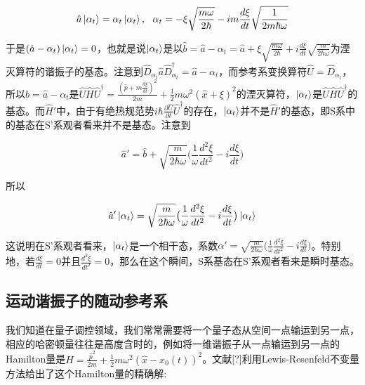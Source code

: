 \documentclass[a4paper]{article}
\begin{document}
        \begin{equation}
            \hat{a}\ket{\alpha_t}=\alpha_t\ket{\alpha_t},\ \ \alpha_t=-\xi\sqrt{\frac{m\omega}{2\hbar}}-im\frac{d\xi}{dt}\sqrt{\frac{1}{2m\hbar\omega}}
        \end{equation}

        于是$(\hat{a}-\alpha_t)\ket{\alpha_t}=0$，也就是说$\ket{\alpha_t}$是以$\hat{b}=\hat{a}-\alpha_t=\hat{a}+\xi\sqrt{\frac{m\omega}{2\hbar}}+i\frac{d\xi}{dt}\sqrt{\frac{m}{2\hbar\omega}}$为湮灭算符的谐振子的基态。注意到$\hat{D}_{\alpha_t}\hat{a}\hat{D}_{\alpha_t}^\dagger=\hat{a}-\alpha_t$，而参考系变换算符$\hat{U}=\hat{D}_{\alpha_t}$，所以$\hat{b}=\hat{a}-\alpha_t$是$\hat{U}\hat{H}\hat{U}^\dagger=\frac{(\hat{p}+m\frac{d\xi}{dt})^2}{2m}+\frac{1}{2}m\omega^2(\hat{x}+\xi)^2$的湮灭算符，$\ket{\alpha_t}$是$\hat{U}\hat{H}\hat{U}^\dagger$的基态。而$\hat{H}'$中，由于有绝热规范势$i\hbar\frac{\partial\hat{U}}{\partial t}\hat{U}^\dagger$的存在，$\ket{\alpha_t}$并不是$\hat{H}'$的基态，即S系中的基态在S'系观者看来并不是基态。注意到
        
        \begin{equation}
            \hat{a}'=\hat{b}+\sqrt{\frac{m}{2\hbar\omega}} \bigl(\frac{1}{\omega}\frac{d^2\xi}{dt^2}-i\frac{d\xi}{dt}\bigr)
        \end{equation}

        所以

        \begin{equation}
            \hat{a}'\ket{\alpha_t}=\sqrt{\frac{m}{2\hbar\omega}}\bigl(\frac{1}{\omega}\frac{d^2\xi}{dt^2}-i\frac{d\xi}{dt}\bigr)\ket{\alpha_t}
        \end{equation}

        这说明在S'系观者看来，$\ket{\alpha_t}$是一个相干态，系数$\alpha'=\sqrt{\frac{m}{2\hbar\omega}}\bigl(\frac{1}{\omega}\frac{d^2\xi}{dt^2}-i\frac{d\xi}{dt}\bigr)$。特别地，若$\frac{d\xi}{dt}=0$并且$\frac{d^2\xi}{dt^2}=0$，那么在这个瞬间，S系基态在S'系观者看来是瞬时基态。

    \subsection{运动谐振子的随动参考系}
        
        我们知道在量子调控领域，我们常常需要将一个量子态从空间一点输运到另一点，相应的哈密顿量往往是高度含时的，例如将一维谐振子从一点输运到另一点的Hamilton量是$\hat{H}=\frac{\hat{p}^2}{2m}+\frac{1}{2}m\omega^2(\hat{x}-x_0(t))^2$。文献[?]利用Lewis-Resenfeld不变量方法给出了这个Hamilton量的精确解:
\end{document}
